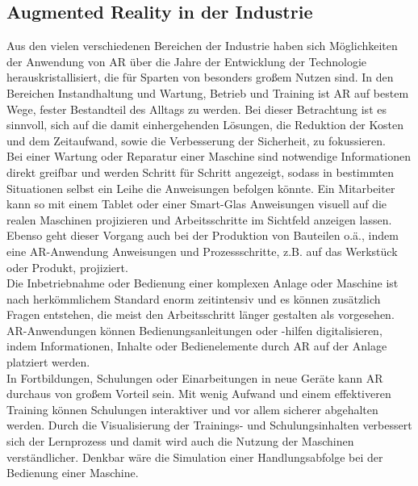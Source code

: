 \subsection{Augmented Reality in der Industrie}
\label{sec:ARIndustrie}
Aus den vielen verschiedenen Bereichen der Industrie haben sich Möglichkeiten der Anwendung von \acl{AR} über die Jahre der Entwicklung der Technologie 
herauskristallisiert, die für Sparten von besonders großem Nutzen sind. \cite{einsatzgebietear.2017a} In den Bereichen 
Instandhaltung und Wartung, Betrieb und Training ist \acl{AR} auf bestem Wege, fester Bestandteil des Alltags zu werden. Bei dieser Betrachtung 
ist es sinnvoll, sich auf die damit einhergehenden Lösungen, die Reduktion der Kosten und dem Zeitaufwand, sowie die Verbesserung 
der Sicherheit, zu fokussieren. \cite{studieptc.2020j} 
\\ 
\linebreak
Bei einer Wartung oder Reparatur einer Maschine sind notwendige Informationen direkt greifbar und werden Schritt für Schritt angezeigt, sodass 
in bestimmten Situationen selbst ein Leihe die Anweisungen befolgen könnte. 
Ein Mitarbeiter kann so mit einem Tablet oder einer Smart-Glas Anweisungen visuell auf die realen Maschinen 
projizieren und Arbeitsschritte im Sichtfeld anzeigen lassen. Ebenso geht dieser Vorgang auch bei der Produktion von Bauteilen o.ä., indem 
eine \acs{AR}-Anwendung Anweisungen und Prozessschritte, z.B. auf das Werkstück oder Produkt, projiziert.
\\ 
Die Inbetriebnahme oder Bedienung einer komplexen Anlage oder Maschine ist nach herkömmlichem Standard enorm zeitintensiv und es können
zusätzlich Fragen entstehen, die meist den Arbeitsschritt länger gestalten als vorgesehen. \acs{AR}-Anwendungen können 
Bedienungsanleitungen oder -hilfen digitalisieren, indem Informationen, Inhalte oder Bedienelemente durch \acl{AR} auf der Anlage platziert werden. 
\\ 
In Fortbildungen, Schulungen oder Einarbeitungen in neue Geräte kann \acs{AR} durchaus von großem Vorteil sein. Mit wenig Aufwand und einem 
effektiveren Training können Schulungen interaktiver und vor allem sicherer abgehalten werden. Durch die Visualisierung der Trainings- und 
Schulungsinhalten verbessert sich der Lernprozess und damit wird auch die Nutzung der Maschinen verständlicher. \cite{einsatzgebietear.2017a} 
Denkbar wäre die Simulation einer Handlungsabfolge bei der Bedienung einer Maschine. 